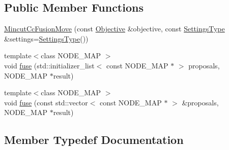 \subsection*{Public Member Functions}
\begin{DoxyCompactItemize}
\item 
\hyperlink{classnifty_1_1graph_1_1optimization_1_1mincut_1_1MincutCcFusionMove_aa1e76fa7e41fc13b04838ab0c07a4138}{Mincut\+Cc\+Fusion\+Move} (const \hyperlink{classnifty_1_1graph_1_1optimization_1_1mincut_1_1MincutCcFusionMove_aceb1de59706d17aba8d8fa6c23d9d01b}{Objective} \&objective, const \hyperlink{structnifty_1_1graph_1_1optimization_1_1mincut_1_1MincutCcFusionMove_1_1SettingsType}{Settings\+Type} \&settings=\hyperlink{structnifty_1_1graph_1_1optimization_1_1mincut_1_1MincutCcFusionMove_1_1SettingsType}{Settings\+Type}())
\item 
{\footnotesize template$<$class N\+O\+D\+E\+\_\+\+M\+A\+P $>$ }\\void \hyperlink{classnifty_1_1graph_1_1optimization_1_1mincut_1_1MincutCcFusionMove_aab5b41ef806b90391e30665d14dd5a51}{fuse} (std\+::initializer\+\_\+list$<$ const N\+O\+D\+E\+\_\+\+M\+A\+P $\ast$ $>$ proposals, N\+O\+D\+E\+\_\+\+M\+A\+P $\ast$result)
\item 
{\footnotesize template$<$class N\+O\+D\+E\+\_\+\+M\+A\+P $>$ }\\void \hyperlink{classnifty_1_1graph_1_1optimization_1_1mincut_1_1MincutCcFusionMove_a5dcb253e26ddbfc2078949b7d9f39851}{fuse} (const std\+::vector$<$ const N\+O\+D\+E\+\_\+\+M\+A\+P $\ast$ $>$ \&proposals, N\+O\+D\+E\+\_\+\+M\+A\+P $\ast$result)
\end{DoxyCompactItemize}


\subsection{Member Typedef Documentation}
\hypertarget{classnifty_1_1graph_1_1optimization_1_1mincut_1_1MincutCcFusionMove_a1dfcd29b86c1bf2a8d17374026b2b263}{}
